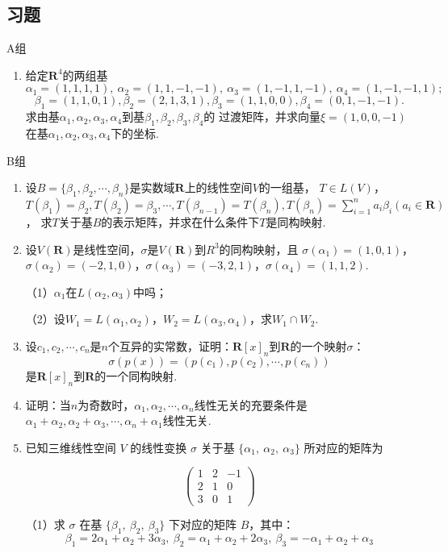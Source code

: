 \subsection{习题}
\centerline{\heiti A组}
\begin{enumerate}
	\item 给定$\mathbf{R}^4$的两组基
	$$\alpha_1=(1,1,1,1),\ \alpha_2=(1,1,-1,-1),\ \alpha_3=(1,-1,1,-1),\ \alpha_4=(1,-1,-1,1);$$
	$$\beta_1=(1,1,0,1),\beta_2=(2,1,3,1),\beta_3=(1,1,0,0),\beta_4=(0,1,-1,-1).$$
	求由基$\alpha_1,\alpha_2,\alpha_3,\alpha_4$到基$\beta_1,\beta_2,\beta_3,\beta_4$的
	过渡矩阵，并求向量$\xi=(1,0,0,-1)$在基$\alpha_1,\alpha_2,\alpha_3,\alpha_4$下的坐标.
\end{enumerate}
\centerline{\heiti B组}
\begin{enumerate}
	\item 设$B=\{\beta_1,\beta_2,\cdots,\beta_n\}$是实数域$\mathbf{R}$上的线性空间$V$的一组基，
	$T \in L(V)$，$T(\beta_1)=\beta_2,T(\beta_2)=\beta_3,\cdots,T(\beta_{n-1})=T(\beta_n),T(\beta_n)=\sum\limits_{i=1}^{n}a_i\beta_i(a_i \in \mathbf{R})$，
	求$T$关于基$B$的表示矩阵，并求在什么条件下$T$是同构映射.
	\item 设$V(\mathbf{R})$是线性空间，$\sigma$是$V(\mathbf{R})$到$R^3$的同构映射，且
	$\sigma(\alpha_1)=(1,0,1)$，$\sigma(\alpha_2)=(-2,1,0)$，$\sigma(\alpha_3)=(-3,2,1)$，$\sigma(\alpha_4)=(1,1,2)$.

	（1）$\alpha_1$在$L(\alpha_2,\alpha_3)$中吗；

	（2）设$W_1=L(\alpha_1,\alpha_2)$，$W_2=L(\alpha_3,\alpha_4)$，求$W_1\cap W_2$.
	\item 设$c_1,c_2,\cdots,c_n$是$n$个互异的实常数，证明：$\mathbf{R}[x]_n$到$\mathbf{R}$的一个映射$\sigma$：
	$$\sigma(p(x))=(p(c_1),p(c_2),\cdots,p(c_n))$$
	是$\mathbf{R}[x]_n$到$\mathbf{R}$的一个同构映射.
	\item 证明：当$n$为奇数时，$\alpha_1,\alpha_2,\cdots,\alpha_n$线性无关的充要条件是
	$\alpha_1+\alpha_2,\alpha_2+\alpha_3,\cdots,\alpha_n+\alpha_1$线性无关.
	\item 已知三维线性空间 $V$ 的线性变换 $\sigma$ 关于基 $\{\alpha_1,\ \alpha_2,\ \alpha_3\}$ 所对应的矩阵为

	$$
	\begin{pmatrix}1 & 2 & -1 \\ 2 & 1 & 0 \\ 3 & 0 & 1\end{pmatrix}
	$$
	
	\textup{（1）}求 $\sigma$ 在基 $\{\beta_1,\ \beta_2,\ \beta_3\}$ 下对应的矩阵 $B$，其中：
		$$
		\beta_1=2\alpha_1+\alpha_2+3\alpha_3,\ \beta_2=\alpha_1+\alpha_2+2\alpha_3,\ \beta_3=-\alpha_1+\alpha_2+\alpha_3
		$$
	

\end{enumerate}
